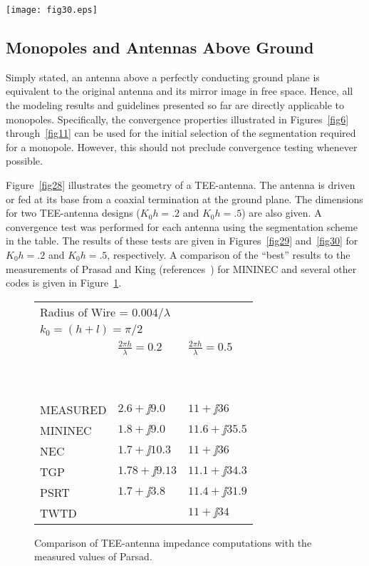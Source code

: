 \documentclass[12pt]{article}
\begin{document}
\begin{sidewaysfigure}[htb]
\centerline{\texttt{[image: fig30.eps]}}
\caption{Convergence test for a TEE antenna with $K_0 h = .5$}
\label{fig30}
\end{sidewaysfigure}
\afterpage\clearpage

\subsection{Monopoles and Antennas Above Ground}
\label{sec-monopoles}
Simply stated, an antenna above a perfectly conducting ground plane is
equivalent to the original antenna and its mirror image in free space.
Hence, all the modeling results and guidelines presented so far are
directly applicable to monopoles. Specifically, the convergence
properties illustrated in Figures~\ref{fig6} through~\ref{fig11} can be
used for the initial selection of the segmentation required for a
monopole. However, this should not preclude convergence testing whenever
possible.

Figure~\ref{fig28} illustrates the geometry of a TEE-antenna. The
antenna is driven or fed at its base from a coaxial termination at the
ground plane. The dimensions for two TEE-antenna designs ($K_0 h = .2$
and $K_0 h = .5$) are also given. A convergence test was performed for
each antenna using the segmentation scheme in the table. The results of
these tests are given in Figures~\ref{fig29} and~\ref{fig30} for
$K_0 h = .2$ and $K_0 h = .5$, respectively. A comparison of the
``best'' results to the measurements of Prasad and King
(references~\cite{r18}) for MININEC and several other codes is given in
Figure~\ref{fig31}.

\begin{figure}[htb]
\begin{tabular}{lll}
\multicolumn{2}{l}{\quad Radius of Wire = $0.004/\lambda$}  \\
\multicolumn{2}{l}{\quad $k_0 = (h + l) = \pi/2$}           \\
         & $\frac{2\pi h}{\lambda}=0.2$ & $\frac{2\pi h}{\lambda}=0.5$ \\
\ \\
\hline
\ \\
MEASURED & $2.6+\jj9.0$                 & $11+\jj36$      \\
MININEC  & $1.8+\jj9.0$                 & $11.6+\jj35.5$  \\
NEC      & $1.7+\jj10.3$                & $11+\jj36$      \\
TGP      & $1.78+\jj9.13$               & $11.1+\jj34.3$  \\
PSRT     & $1.7+\jj3.8$                 & $11.4+\jj31.9$  \\
TWTD     &                              & $11+\jj34$      \\
\end{tabular}
\caption{Comparison of TEE-antenna impedance computations with the
measured values of Parsad.}
\label{fig31}
\end{figure}
\end{document}
